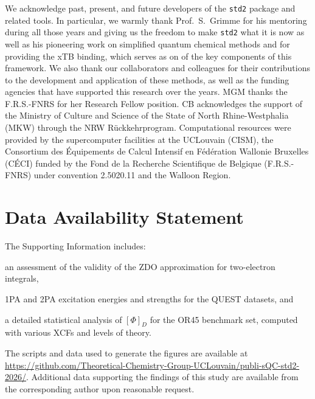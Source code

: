 \documentclass[%
 aip,
 amsmath,amssymb,
preprint,%
]{revtex4-2}
\begin{document}
\begin{acknowledgments}
	We acknowledge past, present, and future developers of the \texttt{std2} package and related tools.
	In particular, we warmly thank Prof.\ S.\ Grimme for his mentoring during all those years and giving us the freedom to make \texttt{std2} what it is now as well as his  pioneering work on simplified quantum chemical methods and for providing the xTB binding, which serves as on of the key components of this framework.
	We also thank our collaborators and colleagues for their contributions to the development and application of these methods, as well as the funding agencies that have supported this research over the years.
	MGM thanks the F.R.S.-FNRS for her Research Fellow position. 
  CB acknowledges the support of the Ministry of Culture and Science of the State of North Rhine-Westphalia (MKW) through the NRW R{\"u}ckkehrprogram. 
	Computational resources were provided by the supercomputer facilities at the UCLouvain (CISM), the Consortium des Équipements de Calcul Intensif en Fédération Wallonie Bruxelles (CÉCI) funded by the Fond de la Recherche Scientifique de Belgique (F.R.S.-FNRS) under convention 2.5020.11 and the Walloon Region.
\end{acknowledgments}

\section*{Data Availability Statement}

The Supporting Information includes: \begin{inparaenum}[(i)]
	\item an assessment of the validity of the ZDO approximation for two-electron integrals,
	\item 1PA and 2PA excitation energies and strengths for the QUEST datasets, and
	\item a detailed statistical analysis of $[\Phi]_D$ for the OR45 benchmark set, computed with various XCFs and levels of theory.
\end{inparaenum}

The scripts and data used to generate the figures are available at \url{https://github.com/Theoretical-Chemistry-Group-UCLouvain/publi-sQC-std2-2026/}.
Additional data supporting the findings of this study are available from the corresponding author upon reasonable request.


\end{document}
